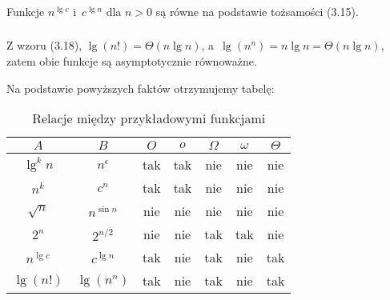 \subsubsection{} %
Funkcje $n^{\lg c}$ i~$c^{\lg n}$ dla $n>0$ są równe na podstawie tożsamości (3.15).

\subsubsection{} %
Z wzoru (3.18), $\lg(n!)=\Theta(n\lg n)$, a~$\lg(n^n)=n\lg n=\Theta(n\lg n)$, zatem obie funkcje są asymptotycznie równoważne.

\bigskip
\noindent Na podstawie powyższych faktów otrzymujemy tabelę:
\begin{table}[h]
	\begin{center}
		\begin{tabular}{cc|c|c|c|c|c|}
			$A$ & $B$ & $O$ & $o$ & $\Omega$ & $\omega$ & $\Theta$ \\
			\hline
			$\lg^kn$ & $n^\epsilon$ & tak & tak & nie & nie & nie \\
			\hline
			$n^k$ & $c^n$ & tak & tak & nie & nie & nie \\
			\hline
			$\sqrt{n}$ & $n^{\sin n}$ & nie & nie & nie & nie & nie \\
			\hline
			$2^n$ & $2^{n/2}$ & nie & nie & tak & tak & nie \\
			\hline
			$n^{\lg c}$ & $c^{\lg n}$ & tak & nie & tak & nie & tak \\
			\hline
			$\lg(n!)$ & $\lg(n^n)$ & tak & nie & tak & nie & tak \\
			\hline
		\end{tabular}
		\caption{Relacje między przykładowymi funkcjami}
	\end{center}
\end{table}

\subsection{} %

